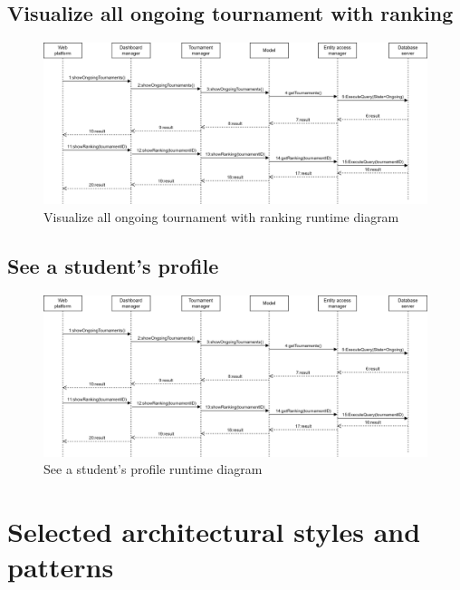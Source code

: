 \subsection*{Visualize all ongoing tournament with ranking}
\begin{figure}[h]
    \centering
    \includegraphics[width=\textwidth]{images/runtime/allTRank.png}
    \caption{Visualize all ongoing tournament with ranking runtime diagram}
    \label{fig:rt-allT}
\end{figure}
\clearpage

\subsection*{See a student's profile}
\begin{figure}[h]
    \centering
    \includegraphics[width=\textwidth]{images/runtime/allTRank.png}
    \caption{See a student's profile runtime diagram}
    \label{fig:rt-seeProfile}
\end{figure}
\clearpage

\section{Selected architectural styles and patterns}
